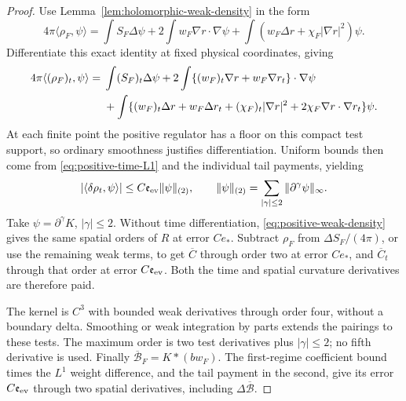 \begin{proof}
Use Lemma~\ref{lem:holomorphic-weak-density} in the form
\begin{equation}
 4\pi\langle\rho_F,\psi\rangle
 =\int S_F\Delta\psi+2\int w_F\nabla r\cdot\nabla\psi
       +\int(w_F\Delta r+\chi_F|\nabla r|^2)\psi.
 \label{eq:positive-weak-density}
\end{equation}
Differentiate this exact identity at fixed physical coordinates, giving
\begin{align}
 4\pi\langle(\rho_F)_t,\psi\rangle
 ={}&\int(S_F)_t\Delta\psi
   +2\int\{(w_F)_t\nabla r+w_F\nabla r_t\}\cdot\nabla\psi\notag\\
 &+\int\{(w_F)_t\Delta r+w_F\Delta r_t
       +(\chi_F)_t|\nabla r|^2
       +2\chi_F\nabla r\cdot\nabla r_t\}\psi.
 \label{eq:positive-differentiated-density}
\end{align}
At each finite point the positive regulator has a floor on this compact
test support, so ordinary smoothness justifies differentiation.
Uniform bounds then come from \eqref{eq:positive-time-L1} and the
individual tail payments, yielding
\begin{equation}
 |\langle\delta\rho_t,\psi\rangle|
       \le C\mathfrak e_{\rm ev}\|\psi\|_{(2)},
 \qquad \|\psi\|_{(2)}=
             \sum_{|\gamma|\le2}\|\partial^\gamma\psi\|_\infty.
 \label{eq:positive-density-time-bound}
\end{equation}
Take $\psi=\partial^\gamma K$, $|\gamma|\le2$.
Without time differentiation, \eqref{eq:positive-weak-density} gives
the same spatial orders of $R$ at error $Ce_*$.
Subtract $\rho_F$ from $\Delta S_F/(4\pi)$, or use the remaining
weak terms, to get $\overline C$ through order two at error $Ce_*$,
and $\overline C_t$ through that order at error
$C\mathfrak e_{\rm ev}$. Both the time and spatial curvature
derivatives are therefore paid.

The kernel is $C^3$ with bounded weak derivatives through order four,
without a boundary delta. Smoothing or weak integration by parts
extends the pairings to these tests. The maximum order is two test
derivatives plus $|\gamma|\le2$; no fifth derivative is used.
Finally $\overline{\mathcal B}_F=K*(bw_F)$.
The first-regime coefficient bound times the $L^1$ weight difference,
and the tail payment in the second, give its error
$C\mathfrak e_{\rm ev}$ through two spatial derivatives, including
$\Delta\overline{\mathcal B}$.
\end{proof}

